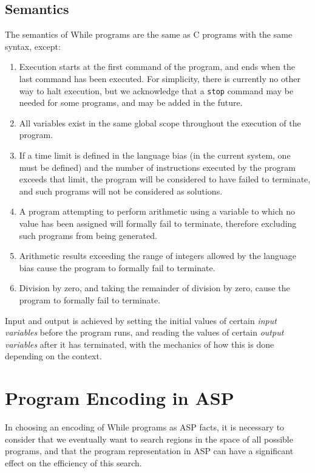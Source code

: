 \documentclass[a4paper,twoside,notitlepage]{report}
\newcommand{\ttt}{\texttt}
\begin{document}
\subsection{Semantics}
The semantics of While programs are the same as C programs with the same 
syntax, except:
\begin{enumerate}
    \item Execution starts at the first command of the program, and ends when 
    the last command has been executed. For simplicity, there is currently no 
    other way to halt execution, but we acknowledge that a \ttt{stop} command 
    may be needed for some programs, and may be added in the future.
    \item All variables exist in the same global scope throughout the 
    execution of the program.
    \item If a time limit is defined in the language bias (in the current 
    system, one must be defined) and the number of instructions executed by 
    the program exceeds that limit, the program will be considered to have 
    failed to terminate, and such programs will not be considered as 
solutions.
    \item A program attempting to perform arithmetic using a variable to which
    no value has been assigned will formally fail to terminate, therefore 
    excluding such programs from being generated.
    \item Arithmetic results exceeding the range of integers allowed by the 
    language bias cause the program to formally fail to terminate.
    \item Division by zero, and taking the remainder of division by zero,
    cause the program to formally fail to terminate.
\end{enumerate}

Input and output is achieved by setting the initial values of certain 
\emph{input variables} before the program runs, and reading the values of 
certain \emph{output variables} after it has terminated, with the 
mechanics of how this is done depending on the context.

\section{Program Encoding in ASP} \label{sec:progenc}

In choosing an encoding of While programs as ASP facts, it is necessary to 
consider that we eventually want to search regions in the space of all 
possible programs, and that the program representation in ASP can have a 
significant effect on the efficiency of this search.
\end{document}
